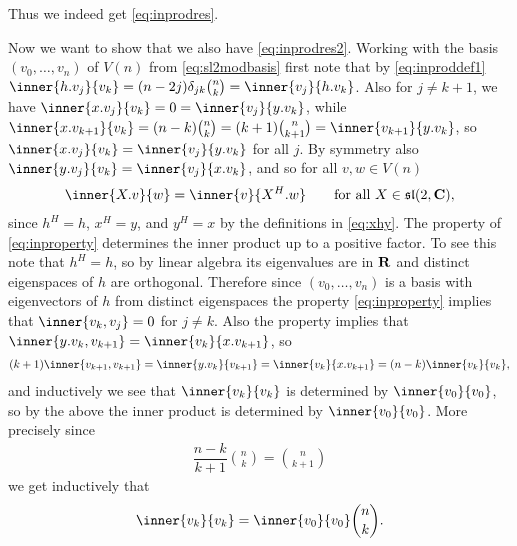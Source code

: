 Thus we indeed get \cref{eq:inprodres}.

Now we want to show that we also have \cref{eq:inprodres2}. Working with the basis $(v_0,\dotsc,v_n)$ of $V(n)$ from \cref{eq:sl2modbasis} first note that by \cref{eq:inproddef1} $\inner{h.v_j}{v_k}=(n-2j)\delta_{jk}\binom{n}{k}=\inner{v_j}{h.v_k}$. Also for $j\neq k+1$, we have $\inner{x.v_j}{v_k}=0=\inner{v_j}{y.v_k}$, while $\inner{x.v_{k+1}}{v_k}=(n-k)\binom{n}{k}=(k+1)\binom{n}{k+1}=\inner{v_{k+1}}{y.v_k}$, so $\inner{x.v_j}{v_k}=\inner{v_j}{y.v_k}$ for all $j$. By symmetry also $\inner{y.v_j}{v_k}=\inner{v_j}{x.v_k}$, and so for all $v,w\in V(n)$
\begin{align}\label{eq:inproperty}
  \inner{X.v}{w} = \inner{v}{X^H.w} \qquad \mbox{for all $X\in\slc$},
\end{align}
since $h^H=h$, $x^H=y$, and $y^H=x$ by the definitions in \cref{eq:xhy}. The property of \cref{eq:inproperty} determines the inner product up to a positive factor. To see this note that $h^H=h$, so by linear algebra its eigenvalues are in $\mathbf{R}$ and distinct eigenspaces of $h$ are orthogonal. Therefore since $(v_0,\dotsc,v_n)$ is a basis with eigenvectors of $h$ from distinct eigenspaces the property \cref{eq:inproperty} implies that $\inner{v_k,v_j}=0$ for $j\neq k$. Also the property implies that $\inner{y.v_k,v_{k+1}}=\inner{v_k}{x.v_{k+1}}$, so
\begin{align*}
  (k+1)\inner{v_{k+1},v_{k+1}} = \inner{y.v_k}{v_{k+1}} = \inner{v_k}{x.v_{k+1}} = (n-k)\inner{v_k}{v_k},
\end{align*}
and inductively we see that $\inner{v_k}{v_k}$ is determined by $\inner{v_0}{v_0}$, so by the above the inner product is determined by $\inner{v_0}{v_0}$. More precisely since 
\begin{align*}
  \dfrac{n-k}{k+1}\binom{n}{k} = \binom{n}{k+1}
\end{align*}
we get inductively that
\begin{align*}
  \inner{v_k}{v_k} = \inner{v_0}{v_0}\binom{n}{k}.
\end{align*}

